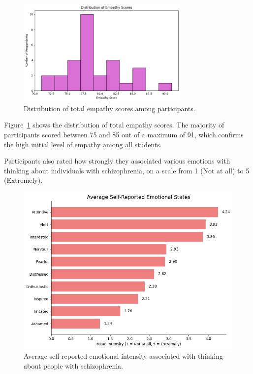 \begin{figure}[htbp]
    \centering
    \includegraphics[width=0.75\textwidth]{../../Figures/avg-scores-summary-pre.png}
    \caption{Distribution of total empathy scores among participants.}
    \label{fig:score_distribution_pre}
\end{figure}

\vspace{1em}

Figure~\ref{fig:score_distribution_pre} shows the distribution of total empathy scores. The majority of participants scored between 75 and 85 out of a maximum of 91, which confirms the high initial level of empathy among all students. 

\vspace{1em}

Participants also rated how strongly they associated various emotions with thinking about individuals with schizophrenia, on a scale from 1 (Not at all) to 5 (Extremely).

\begin{figure}[htbp]
    \centering
    \includegraphics[width=0.7\columnwidth]{../../Figures/avg-emotions-pre.png}
    \caption{Average self-reported emotional intensity associated with thinking about people with schizophrenia.}
    \label{fig:avg_emotions_pre}
\end{figure}

